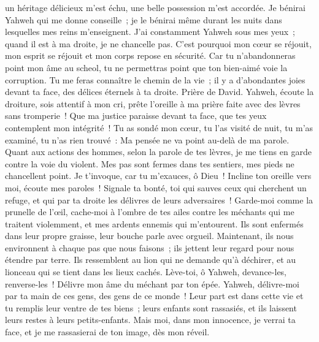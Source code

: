\begin{multicols}{2}
un héritage délicieux m'est échu, une belle possession m'est accordée.
Je bénirai Yahweh qui me donne conseille~; je le bénirai même durant les nuits dans lesquelles mes reins m'enseignent.
J'ai constamment Yahweh sous mes yeux~; quand il est à ma droite, je ne chancelle pas.
C'est pourquoi mon cœur se réjouit, mon esprit se réjouit et mon corps repose en sécurité.
Car tu n'abandonneras point mon âme au scheol, tu ne permettras point que ton bien-aimé voie la corruption.
Tu me feras connaître le chemin de la vie~; il y a d'abondantes joies devant ta face, des délices éternels à ta droite.
\VerseOne{}Prière de David. Yahweh, écoute la droiture, sois attentif à mon cri, prête l'oreille à ma prière faite avec des lèvres sans tromperie~!
Que ma justice paraisse devant ta face, que tes yeux contemplent mon intégrité~!
Tu as sondé mon cœur, tu l'as visité de nuit, tu m'as examiné, tu n'as rien trouvé~: Ma pensée ne va point au-delà de ma parole.
Quant aux actions des hommes, selon la parole de tes lèvres, je me tiens en garde contre la voie du violent.
Mes pas sont fermes dans tes sentiers, mes pieds ne chancellent point.
Je t'invoque, car tu m'exauces, ô Dieu~! Incline ton oreille vers moi, écoute mes paroles~!
Signale ta bonté, toi qui sauves ceux qui cherchent un refuge, et qui par ta droite les délivres de leurs adversaires~!
Garde-moi comme la prunelle de l'œil, cache-moi à l'ombre de tes ailes
contre les méchants qui me traitent violemment, et mes ardents ennemis qui m'entourent.
Ils sont enfermés dans leur propre graisse, leur bouche parle avec orgueil.
Maintenant, ils nous environnent à chaque pas que nous faisons~; ils jettent leur regard pour nous étendre par terre.
Ils ressemblent au lion qui ne demande qu'à déchirer, et au lionceau qui se tient dans les lieux cachés.
Lève-toi, ô Yahweh, devance-les, renverse-les~! Délivre mon âme du méchant par ton épée.
Yahweh, délivre-moi par ta main de ces gens, des gens de ce monde~! Leur part est dans cette vie et tu remplis leur ventre de tes biens~; leurs enfants sont rassasiés, et ils laissent leurs restes à leurs petits-enfants.
Mais moi, dans mon innocence, je verrai ta face, et je me rassasierai de ton image, dès mon réveil.

\end{multicols}
